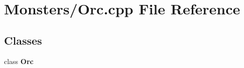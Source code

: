 \section{Monsters/\-Orc.cpp File Reference}
\label{_orc_8cpp}
\subsection*{Classes}
\begin{DoxyCompactItemize}
\item 
class {\bf Orc}
\end{DoxyCompactItemize}
